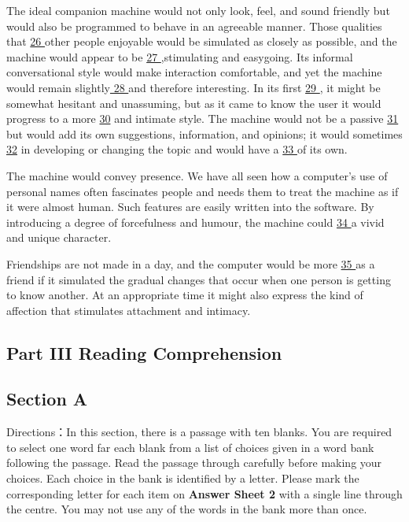 \documentclass[UTF8,11pt]{ctexart}
\begin{document}
The ideal companion machine would not only look, feel, and sound friendly but would also be programmed to behave in an agreeable manner. Those qualities that \uline{26 }other people enjoyable would be simulated as closely as possible, and the machine would appear to be \uline{27 },stimulating and easygoing. Its informal conversational style would make interaction comfortable, and yet the machine would remain slightly\uline{ 28 }and therefore interesting. In its first \uline{29 }, it might be somewhat hesitant and unassuming, but as it came to know the user it would progress to a more \uline{30} and intimate style. The machine would not be a passive \uline{31} but would add its own suggestions, information, and opinions; it would sometimes \uline{32} in developing or changing the topic and would have a \uline{33 }of its own.


The machine would convey presence. We have all seen how a computer’s use of personal names often fascinates people and needs them to treat the machine as if it were almost human. Such features are easily written into the software. By introducing a degree of forcefulness and humour, the machine could \uline{34 }a vivid and unique character.


Friendships are not made in a day, and the computer would be more \uline{35 }as a friend if it simulated the gradual changes that occur when one person is getting to know another. At an appropriate time it might also express the kind of affection that stimulates attachment and intimacy.


\subsection*{\textbf{Part} III \textbf{Reading Comprehension}}


\subsection*{\textbf{Section A}}


Directions：In this section, there is a passage with ten blanks. You are required to select one word far each blank from a list of choices given in a word bank following the passage. Read the passage through carefully before making your choices. Each choice in the bank is identified by a letter. Please mark the corresponding letter for each item on\textbf{ Answer Sheet 2} with a single line through the centre. You may not use any of the words in the bank more than once.
\end{document}
